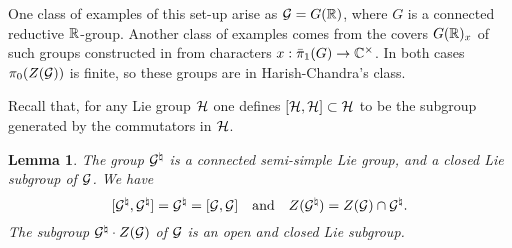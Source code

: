 \documentclass{article}
\newtheorem{lem}[thm]{Lemma}
\theoremstyle{definition}
\numberwithin{equation}{section}
\renewcommand{\-}{\hyp{}}
\begin{document}
One class of examples of this set-up arise as $\mathcal{G}=G(\mathbb{R})$, where $G$ is a connected reductive $\mathbb{R}$-group. Another class of examples comes from the covers $G(\mathbb{R})_x$ of such groups constructed in \cite{KalHDC} from characters $x : \bar\pi_1(G) \to \mathbb{C}^\times$. In both cases $\pi_0(Z(\mathcal{G}))$ is finite, so these groups are in  Harish-Chandra's class.

Recall that, for any Lie group $\mathcal{H}$ one defines $[\mathcal{H},\mathcal{H}] \subset \mathcal{H}$ to be the subgroup generated by the commutators in $\mathcal{H}$.

\begin{lem} \label{lem:comm}
	The group $\mathcal{G}^\natural$ is a connected semi-simple Lie group, and a closed Lie subgroup of $\mathcal{G}$. We have
	\[ [\mathcal{G}^\natural,\mathcal{G}^\natural] = \mathcal{G}^\natural = [\mathcal{G},\mathcal{G}]\quad\textrm{and}\quad Z(\mathcal{G}^\natural) = Z(\mathcal{G}) \cap \mathcal{G}^\natural. \]
	The subgroup $\mathcal{G}^\natural \cdot Z(\mathcal{G})$ of $\mathcal{G}$ is an open and closed Lie subgroup.
\end{lem}
\end{document}
